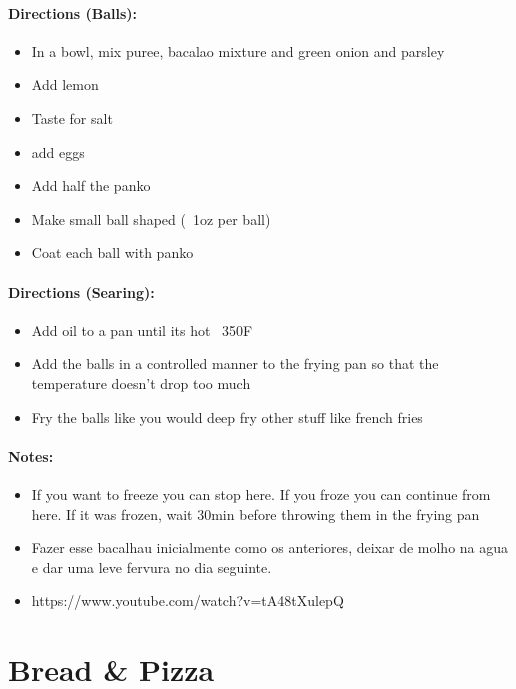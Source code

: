 \documentclass{article}
\begin{document}
\paragraph{Directions (Balls):}
\begin{itemize}
    \item In a bowl, mix puree, bacalao mixture and green onion and parsley
    \item Add lemon
    \item Taste for salt
    \item add  eggs
    \item Add half the panko
    \item Make small ball shaped (~1oz per ball)
    \item Coat each ball with panko
\end{itemize}  

\paragraph{Directions (Searing):}
\begin{itemize}
    \item Add oil to a pan until its hot ~350F
    \item Add the balls in a controlled manner to the frying pan so that the temperature doesn't drop too much
    \item Fry the balls like you would deep fry other stuff like french fries
\end{itemize} 

\paragraph{Notes:}
\begin{itemize}
    \item If you want to freeze you can stop here. If you froze you can continue from here. If it was frozen, wait 30min before throwing them in the frying pan
    \item Fazer esse bacalhau inicialmente como os anteriores, deixar de molho na agua e dar uma leve fervura no dia seguinte.
    \item https://www.youtube.com/watch?v=tA48tXulepQ
\end{itemize}

\section{Bread \& Pizza}
\end{document}
